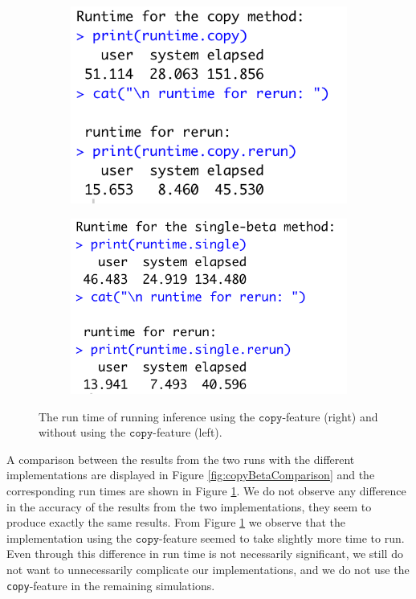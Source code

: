 \begin{figure}[h!]
    \centering
    \begin{subfigure}[b]{0.45\textwidth}
        \centering
        \includegraphics[trim=0 5 0 0,clip,width=\textwidth]{synthetic-data/Figures/runtime-copy.png}
    \end{subfigure}
    \begin{subfigure}[b]{0.45\textwidth}
        \centering
        \includegraphics[trim=0 0 15 0,clip, width=\textwidth]{synthetic-data/Figures/runtime-single.png}
    \end{subfigure}
    \caption{The run time of running \inlabru inference using the $\texttt{copy}$-feature (right) and without using the $\texttt{copy}$-feature (left).}
    \label{fig:copyBetaRuntimes}
\end{figure}

A comparison between the results from the two runs with the different implementations are displayed in Figure \ref{fig:copyBetaComparison} and the corresponding run times are shown in Figure \ref{fig:copyBetaRuntimes}. We do not observe any difference in the accuracy of the results from the two implementations, they seem to produce exactly the same results. From Figure \ref{fig:copyBetaRuntimes} we observe that the implementation using the $\texttt{copy}$-feature seemed to take slightly more time to run. Even through this difference in run time is not necessarily significant, we still do not want to unnecessarily complicate our implementations, and we do not use the \texttt{copy}-feature in the remaining simulations.

